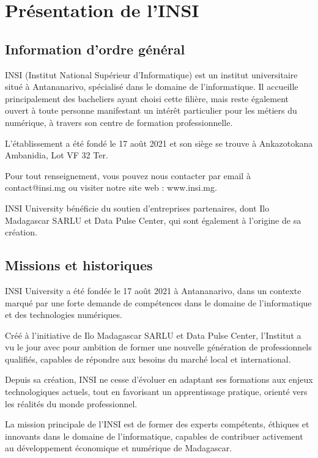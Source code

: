 \documentclass[a4paper,12pt]{article}
\begin{document}





\chapter{Présentation de l'INSI}
\section{Information d'ordre général}

INSI (Institut National Supérieur d'Informatique) est un institut universitaire situé à Antananarivo, spécialisé dans le domaine de l'informatique. Il accueille principalement des bacheliers ayant choisi cette filière, mais reste également ouvert à toute personne manifestant un intérêt particulier pour les métiers du numérique, à travers son centre de formation professionnelle.

L'établissement a été fondé le 17 août 2021 et son siège se trouve à Ankazotokana Ambanidia, Lot VF 32 Ter.

Pour tout renseignement, vous pouvez nous contacter par email à contact@insi.mg ou visiter notre site web : www.insi.mg.

INSI University bénéficie du soutien d'entreprises partenaires, dont Ilo Madagascar SARLU et Data Pulse Center, qui sont également à l'origine de sa création.
\section{Missions et historiques}

INSI University a été fondée le 17 août 2021 à Antananarivo, dans un contexte marqué par une forte demande de compétences dans le domaine de l'informatique et des technologies numériques.

Créé à l'initiative de Ilo Madagascar SARLU et Data Pulse Center, l'Institut a vu le jour avec pour ambition de former une nouvelle génération de professionnels qualifiés, capables de répondre aux besoins du marché local et international.

Depuis sa création, INSI ne cesse d'évoluer en adaptant ses formations aux enjeux technologiques actuels, tout en favorisant un apprentissage pratique, orienté vers les réalités du monde professionnel.

La mission principale de l'INSI est de former des experts compétents, éthiques et innovants dans le domaine de l'informatique, capables de contribuer activement au développement économique et numérique de Madagascar.
\end{document}
